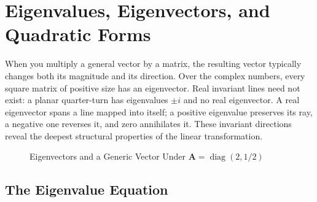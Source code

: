 \section{Eigenvalues, Eigenvectors, and Quadratic Forms}
\label{sec:eigenvalues}

When you multiply a general vector by a matrix, the resulting vector typically changes both its magnitude and its direction. Over the complex numbers, every square matrix of positive size has an eigenvector. Real invariant lines need not exist: a planar quarter-turn has eigenvalues $\pm i$ and no real eigenvector. A real eigenvector spans a line mapped into itself; a positive eigenvalue preserves its ray, a negative one reverses it, and zero annihilates it. These invariant directions reveal the deepest structural properties of the linear transformation.

\begin{figure}[htb]
\centering
{}
\caption{Eigenvectors and a Generic Vector Under $\mathbf A=\operatorname{diag}(2,1/2)$}
\label{fig:eigenvector_geometry}
\end{figure}

\subsection{The Eigenvalue Equation}
\label{subsec:eigen_equation}

